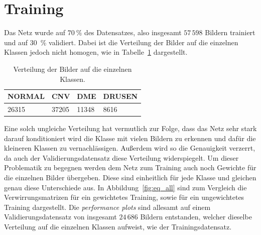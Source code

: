 \section{Training}
%
Das Netz wurde auf $\SI{70}{\percent}$ des Datensatzes, also insgesamt
$57\,598$ Bildern trainiert und auf \SI{30}{\percent} validiert. Dabei ist die
Verteilung der Bilder auf die einzelnen Klassen jedoch nicht homogen, wie in
Tabelle~\ref{tab:count} dargestellt.
%
\renewcommand{\baselinestretch}{1.0}
\begin{table}[htb]
  \centering%
  \begin{tabular}{l
                  l
                  l
                  l}
      \toprule
      NORMAL    & CNV    & DME & DRUSEN \\
      \midrule
      26315     & 37205  & 11348 & 8616 \\
      \bottomrule
  \end{tabular}
  \caption{Verteilung der Bilder auf die einzelnen Klassen.}
  \label{tab:count}
\end{table}
\renewcommand{\baselinestretch}{1.5}
%
Eine solch ungleiche Verteilung hat vermutlich zur Folge, dass das Netz sehr
stark darauf konditioniert wird die Klasse mit vielen Bildern zu erkennen und
dafür die kleineren Klassen zu vernachlässigen. Außerdem wird so die
Genauigkeit verzerrt, da auch der Validierungsdatensatz diese Verteilung
widerspiegelt. Um dieser Problematik zu begegnen werden dem Netz zum Training
auch noch Gewichte für die einzelnen Bilder übergeben. Diese sind einheitlich
für jede Klasse und gleichen genau diese Unterschiede aus.
In Abbildung~\ref{fig:eq_all} sind zum Vergleich die Verwirrungsmatrizen
für ein gewichtetes Training, sowie für ein ungewichtetes Training dargestellt.
Die \textit{performance plots} sind allesamt auf einem Validierungsdatensatz
von insgesamt $24\,686$ Bildern entstanden, welcher dieselbe Verteilung auf
die einzelnen Klassen aufweist, wie der Trainingsdatensatz.
%
